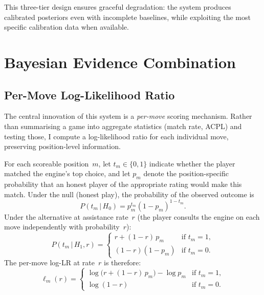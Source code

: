 \documentclass[11pt,a4paper]{article}
\newcommand{\given}{\,|\,}
\theoremstyle{definition}
\begin{document}
This three-tier design ensures graceful degradation: the system produces
calibrated posteriors even with incomplete baselines, while exploiting
the most specific calibration data when available.


\section{Bayesian Evidence Combination}
\label{sec:evidence}

\subsection{Per-Move Log-Likelihood Ratio}
\label{sec:permove}

The central innovation of this system is a \emph{per-move} scoring
mechanism.  Rather than summarising a game into aggregate statistics
(match rate, ACPL) and testing those, I compute a log-likelihood ratio
for each individual move, preserving position-level information.

For each scoreable position~$m$, let $t_m \in \{0,1\}$ indicate whether
the player matched the engine's top choice, and let $p_m$ denote the
position-specific probability that an honest player of the appropriate
rating would make this match.  Under the null (honest play), the
probability of the observed outcome is
\begin{equation}
  \label{eq:null-move}
  P(t_m \given H_0) = p_m^{t_m} (1-p_m)^{1-t_m}.
\end{equation}
Under the alternative at assistance rate~$r$ (the player consults the
engine on each move independently with probability~$r$):
\begin{equation}
  \label{eq:alt-move}
  P(t_m \given H_1, r) =
  \begin{cases}
    r + (1-r)\,p_m & \text{if } t_m = 1, \\
    (1-r)(1-p_m)   & \text{if } t_m = 0.
  \end{cases}
\end{equation}
The per-move log-LR at rate~$r$ is therefore:
\begin{equation}
  \label{eq:permove-lr}
  \ell_m(r) =
  \begin{cases}
    \log\!\bigl(r + (1-r)\,p_m\bigr) - \log p_m & \text{if } t_m = 1, \\
    \log(1-r) & \text{if } t_m = 0.
  \end{cases}
\end{equation}
\end{document}
